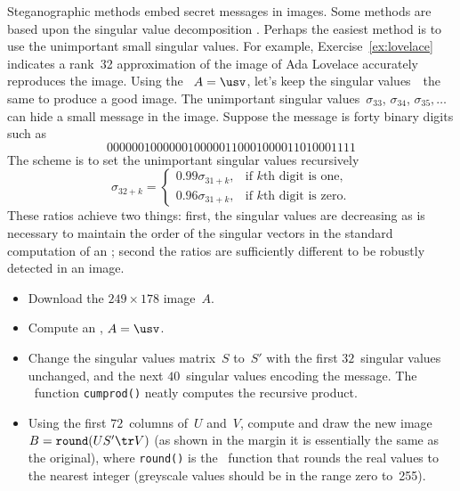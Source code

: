 \begin{exercise} \label{ex:} 
 Steganographic methods embed secret messages in images.
Some methods are based upon the singular value decomposition \cite[e.g.]{Gorodetski2001}. %
Perhaps the easiest method is to use the unimportant small singular values.
For example, Exercise~\ref{ex:lovelace} indicates a rank~32 approximation of the image of Ada Lovelace accurately reproduces the image.
Using the \svd\ \(A=\usv\), let's keep the singular values~\hlist{}\ the same to produce a good image.
The unimportant singular values~\(\sigma_{33}\), \(\sigma_{34}\), \(\sigma_{35},\ldots\) can hide a small message in the image.
Suppose the message is forty binary digits such as
\begin{equation*}
0000001000000100000110001000011010001111
\end{equation*}
The scheme is to set the unimportant singular values recursively
\begin{equation*}
\sigma_{32+k}=\begin{cases}0.99\sigma_{31+k},
&\text{if \(k\)th digit is one},
\\0.96\sigma_{31+k},
&\text{if \(k\)th digit is zero}.
\end{cases}
\end{equation*}
These ratios achieve two things: first, the singular values are decreasing as is necessary to maintain the order of the singular vectors in the standard computation of an \svd; second the ratios are sufficiently different to be robustly detected in an image.
\begin{itemize}
\item Download the \(249\times178\) image~\(A\).

\item Compute an \svd, \(A=\usv\).

\item Change the singular values matrix~\(S\) to~\(S'\) with the first \(32\)~singular values unchanged, and the next \(40\)~singular values encoding the message.
The \script\ function \verb|cumprod()| neatly computes the recursive product.

\item Using the first \(72\)~columns of~\(U\) and~\(V\), compute and draw the new image \(B=\verb|round|(US'\tr V)\) (as shown in the margin it is essentially the same as the original),
where \verb|round()| is the \script\ function that rounds the real values to the nearest integer (greyscale values should be in the range zero to~255). 


\end{itemize}
\end{exercise}
